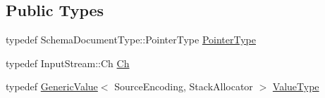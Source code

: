 \subsection*{Public Types}
\begin{DoxyCompactItemize}
\item 
typedef Schema\+Document\+Type\+::\+Pointer\+Type \hyperlink{classSchemaValidatingReader_a30ecf1b20ca5a1b79e0d5f4ceb3bf198}{Pointer\+Type}
\item 
typedef Input\+Stream\+::\+Ch \hyperlink{classSchemaValidatingReader_a6eb6f887a49dbb400800ab4fc01f02c7}{Ch}
\item 
typedef \hyperlink{classGenericValue}{Generic\+Value}$<$ Source\+Encoding, Stack\+Allocator $>$ \hyperlink{classSchemaValidatingReader_af08b51fcef602c68d95769c35ae606be}{Value\+Type}
\end{DoxyCompactItemize}
